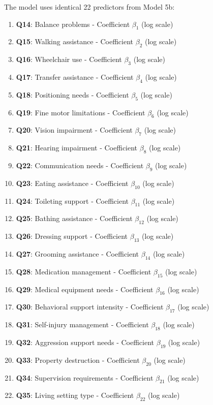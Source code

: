 The model uses identical 22 predictors from Model 5b:
\begin{enumerate}
    \item \textbf{Q14}: Balance problems - Coefficient $\beta_1$ (log scale)
    \item \textbf{Q15}: Walking assistance - Coefficient $\beta_2$ (log scale)
    \item \textbf{Q16}: Wheelchair use - Coefficient $\beta_3$ (log scale)
    \item \textbf{Q17}: Transfer assistance - Coefficient $\beta_4$ (log scale)
    \item \textbf{Q18}: Positioning needs - Coefficient $\beta_5$ (log scale)
    \item \textbf{Q19}: Fine motor limitations - Coefficient $\beta_6$ (log scale)
    \item \textbf{Q20}: Vision impairment - Coefficient $\beta_7$ (log scale)
    \item \textbf{Q21}: Hearing impairment - Coefficient $\beta_8$ (log scale)
    \item \textbf{Q22}: Communication needs - Coefficient $\beta_9$ (log scale)
    \item \textbf{Q23}: Eating assistance - Coefficient $\beta_{10}$ (log scale)
    \item \textbf{Q24}: Toileting support - Coefficient $\beta_{11}$ (log scale)
    \item \textbf{Q25}: Bathing assistance - Coefficient $\beta_{12}$ (log scale)
    \item \textbf{Q26}: Dressing support - Coefficient $\beta_{13}$ (log scale)
    \item \textbf{Q27}: Grooming assistance - Coefficient $\beta_{14}$ (log scale)
    \item \textbf{Q28}: Medication management - Coefficient $\beta_{15}$ (log scale)
    \item \textbf{Q29}: Medical equipment needs - Coefficient $\beta_{16}$ (log scale)
    \item \textbf{Q30}: Behavioral support intensity - Coefficient $\beta_{17}$ (log scale)
    \item \textbf{Q31}: Self-injury management - Coefficient $\beta_{18}$ (log scale)
    \item \textbf{Q32}: Aggression support needs - Coefficient $\beta_{19}$ (log scale)
    \item \textbf{Q33}: Property destruction - Coefficient $\beta_{20}$ (log scale)
    \item \textbf{Q34}: Supervision requirements - Coefficient $\beta_{21}$ (log scale)
    \item \textbf{Q35}: Living setting type - Coefficient $\beta_{22}$ (log scale)
\end{enumerate}


